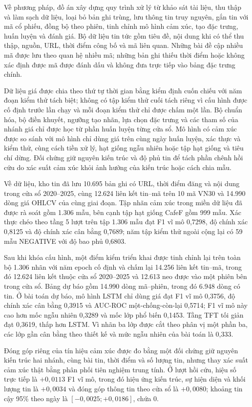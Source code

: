 Về phương pháp, đồ án xây dựng quy trình xử lý từ khảo sát tài liệu, thu thập và làm sạch
dữ liệu, loại bỏ bản ghi trùng, lưu thông tin truy nguyên, gắn tin với mã cổ phiếu, đồng
bộ theo phiên, tinh chỉnh mô hình cảm xúc, tạo đặc trưng, huấn luyện và đánh giá. Bộ dữ
liệu tin tức gồm tiêu đề, nội dung khi có thể thu thập, nguồn, URL, thời điểm công bố và
mã liên quan. Những bài đề cập nhiều mã được lưu theo quan hệ nhiều mã; những bản ghi
thiếu thời điểm hoặc không xác định được mã được đánh dấu và không đưa trực tiếp vào
bảng đặc trưng chính.

Dữ liệu giá được chia theo thứ tự thời gian bằng kiểm định cuốn chiếu với năm đoạn kiểm
thử tách biệt; không có tập kiểm thử cuối tách riêng vì cấu hình được cố định trước lần
chạy và mỗi đoạn kiểm thử chỉ được chấm một lần. Bộ chuẩn hóa, bộ điền khuyết, ngưỡng tạo
nhãn, lựa chọn đặc trưng và các tham số của nhánh giá chỉ được học từ phần huấn luyện từng
cửa sổ. Mô hình có cảm xúc được so sánh với mô hình chỉ dùng giá trên cùng ngày huấn luyện,
xác thực và kiểm thử, cùng cách tiền xử lý, hạt giống ngẫu nhiên hoặc tập hạt giống và
tiêu chí dừng. Đối chứng giữ nguyên kiến trúc và độ phủ tin để tách phần chênh hồi cứu do
xác suất cảm xúc khỏi ảnh hưởng của kiến trúc hoặc cách chia mẫu.

Về dữ liệu, kho tin đã lưu 10.695 bản ghi có URL, thời điểm đăng và nội dung trong cửa sổ
2020--2025, cùng 12.624 liên kết tin--mã trên 10 mã VN30 và 14.990 dòng giá
OHLCV của cùng giai đoạn. Tập nhãn cảm xúc trong miền dữ liệu đã được rà soát
gồm 1.306 mẫu, bên cạnh tập hạt giống CafeF gồm 999 mẫu. Xác thực chéo theo tầng 5 lượt
trên tập 1.306 mẫu đạt F1 vĩ mô 0,7298, độ chính xác 0,8125 và độ chính xác cân bằng
0,7689; năm tập kiểm thử ngoài cộng lại có 59 mẫu NEGATIVE với độ bao phủ 0,6803.

Sau khi khóa cấu hình, một điểm kiểm triển khai được tinh chỉnh lại trên toàn bộ 1.306
nhãn với năm epoch cố định và chấm lại 14.256 liên kết tin--mã, trong đó 12.624 liên kết
thuộc cửa sổ 2020--2025 và 12.613 neo được vào một phiên bên trong cửa sổ. Bảng dự báo gồm 14.990
dòng mã--phiên, trong đó 6.948 dòng có tin. Ở bài toán dự báo, mô hình LSTM chỉ dùng giá
đạt F1 vĩ mô 0,3756, độ chính xác cân bằng 0,3915 và AUC-ROC một-chống-còn-lại 0,5714;
F1 vĩ mô này cao hơn mốc ngẫu nhiên 0,3289 và mốc lớp phổ biến 0,1453. Tầng TFT tối giản
đạt 0,3619, thấp hơn LSTM. Vì nhãn ba lớp được cắt theo phân vị một phần ba, các lớp gần
cân bằng theo thiết kế và mức ngẫu nhiên của bài toán là 0,333.

Đóng góp riêng của tín hiệu cảm xúc được đo bằng một đối chứng giữ nguyên kiến
trúc hai nhánh, cùng bài tin, thời điểm và số lượng tin, nhưng thay xác suất cảm
xúc thật bằng phân phối tiên nghiệm trung tính. Ở lượt hồi cứu, hiệu số trực tiếp
là $+0{,}0113$ F1 vĩ mô, trong đó hiệu ứng kiến trúc, sự hiện diện và khối lượng
tin là $+0{,}0034$ và đóng góp thông tin theo cửa sổ là $+0{,}0080$; khoảng tin
cậy 95\% theo ngày là $[-0{,}0025; +0{,}0186]$, chứa 0.

